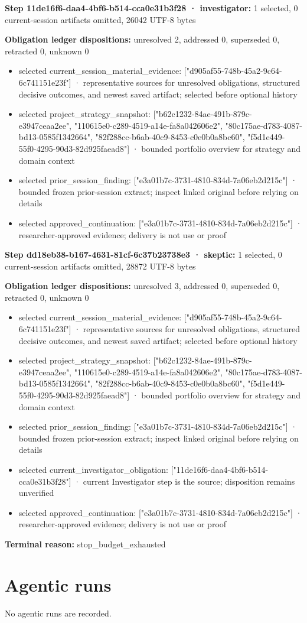 \documentclass[11pt]{article}
\begin{document}
\textbf{Step 11de16f6-daa4-4bf6-b514-cca0e31b3f28 · investigator:} 1 selected, 0 current-session artifacts omitted, 26042 UTF-8 bytes\par
\textbf{Obligation ledger dispositions:} unresolved 2, addressed 0, superseded 0, retracted 0, unknown 0\par
\begin{itemize}
\item selected current\_session\_material\_evidence: ["d905af55-748b-45a2-9c64-6c741151e23f"] · representative sources for unresolved obligations, structured decisive outcomes, and newest saved artifact; selected before optional history
\item selected project\_strategy\_snapshot: ["b62c1232-84ae-491b-879c-e3947ceaa2ee", "110615e0-c289-4519-a14e-fa8a042606e2", "80c175ae-d783-4087-bd13-0585f1342664", "82f288cc-b6ab-40c9-8453-c0e0b0a8bc60", "f5d1e449-55f0-4295-90d3-82d925faead8"] · bounded portfolio overview for strategy and domain context
\item selected prior\_session\_finding: ["e3a01b7c-3731-4810-834d-7a06eb2d215c"] · bounded frozen prior-session extract; inspect linked original before relying on details
\item selected approved\_continuation: ["e3a01b7c-3731-4810-834d-7a06eb2d215c"] · researcher-approved evidence; delivery is not use or proof
\end{itemize}
\textbf{Step dd18eb38-b167-4631-81cf-6c37b23738e3 · skeptic:} 1 selected, 0 current-session artifacts omitted, 28872 UTF-8 bytes\par
\textbf{Obligation ledger dispositions:} unresolved 3, addressed 0, superseded 0, retracted 0, unknown 0\par
\begin{itemize}
\item selected current\_session\_material\_evidence: ["d905af55-748b-45a2-9c64-6c741151e23f"] · representative sources for unresolved obligations, structured decisive outcomes, and newest saved artifact; selected before optional history
\item selected project\_strategy\_snapshot: ["b62c1232-84ae-491b-879c-e3947ceaa2ee", "110615e0-c289-4519-a14e-fa8a042606e2", "80c175ae-d783-4087-bd13-0585f1342664", "82f288cc-b6ab-40c9-8453-c0e0b0a8bc60", "f5d1e449-55f0-4295-90d3-82d925faead8"] · bounded portfolio overview for strategy and domain context
\item selected prior\_session\_finding: ["e3a01b7c-3731-4810-834d-7a06eb2d215c"] · bounded frozen prior-session extract; inspect linked original before relying on details
\item selected current\_investigator\_obligation: ["11de16f6-daa4-4bf6-b514-cca0e31b3f28"] · current Investigator step is the source; disposition remains unverified
\item selected approved\_continuation: ["e3a01b7c-3731-4810-834d-7a06eb2d215c"] · researcher-approved evidence; delivery is not use or proof
\end{itemize}
\textbf{Terminal reason:} stop\_budget\_exhausted\par
\section{Agentic runs}
No agentic runs are recorded.\par
\end{document}
